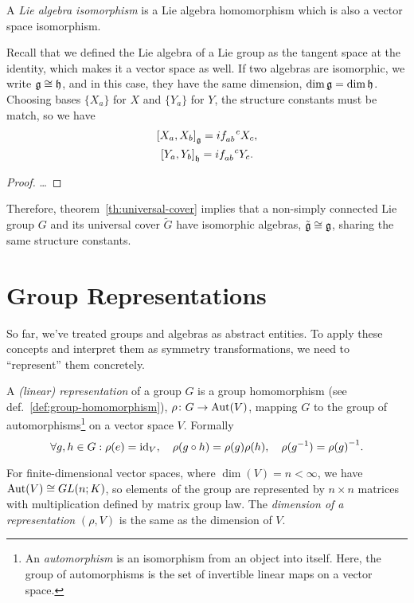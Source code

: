 \begin{definition}
    A \emph{Lie algebra isomorphism} is a Lie algebra homomorphism which is also a vector space isomorphism.
\end{definition}

Recall that we defined the Lie algebra of a Lie group as the tangent space at the identity, which makes it a vector space as well. If two algebras are isomorphic, we write $\mathfrak{g} \cong \mathfrak{h}$, and in this case, they have the same dimension, $\dim \mathfrak{g} = \dim \mathfrak{h}$. Choosing bases $\{X_a\}$ for $X$ and $\{Y_a\}$ for $Y$, the structure constants must be match, so we have
\begin{gather*}
    \comm{X_a}{X_b}_\g = i \tensor{f}{_a_b^c} X_c ,\\
    \comm{Y_a}{Y_b}_\h = i \tensor{f}{_a_b^c} Y_c .
\end{gather*}

\begin{proof}
    \color{red} \dots \color{black}
\end{proof}

Therefore, theorem~\ref{th:universal-cover} implies that a non-simply connected Lie group $G$ and its universal cover $\tilde{G}$ have isomorphic algebras, $\tilde{\mathfrak{g}} \cong \mathfrak{g}$, sharing the same structure constants.

    

\section{Group Representations}\label{sec:group-representation}
So far, we've treated groups and algebras as abstract entities. To apply these concepts and interpret them as symmetry transformations, we need to “represent” them concretely.

\begin{definition}\label{def:representation}
    A \emph{(linear) representation} of a group $G$ is a group homomorphism (see def.~\ref{def:group-homomorphism}), $\rho \colon G \to \operatorname{Aut}(V)$, mapping $G$ to the group of automorphisms\footnote{An \emph{automorphism} is an isomorphism from an object into itself. Here, the group of automorphisms is the set of invertible linear maps on a vector space.} on a vector space $V$. Formally
    \begin{equation}\label{eq:representation-property}
        \forall g, h \in G: \rho(e) = \operatorname{id}_V, \quad \rho(g \circ h) = \rho(g)\rho(h), \quad \rho(g^{-1}) = {\rho(g)}^{-1} .
    \end{equation}
\end{definition}
For finite-dimensional vector spaces, where $\dim(V) = n < \infty$, we have $\operatorname{Aut}(V) \cong GL(n;K)$, so elements of the group are represented by $n \times n$ matrices with multiplication defined by matrix group law. The \emph{dimension of a representation} $(\rho, V)$ is the same as the dimension of $V$.

